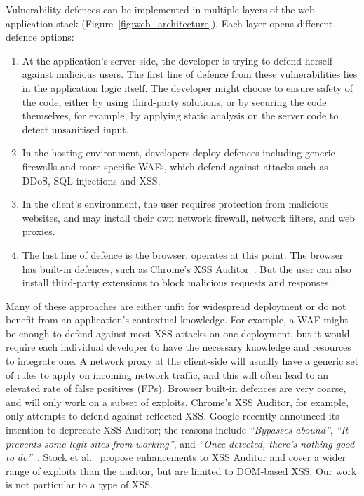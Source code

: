 Vulnerability defences can be implemented in multiple layers of the web application stack (Figure~\ref{fig:web_architecture}). Each layer opens different defence options:
\begin{enumerate}
	\item At the application's server-side, the developer is
          trying to defend herself against malicious users. The first
          line of defence from these vulnerabilities lies in the
          application logic itself. The developer might choose to
          ensure safety of the code, either by using third-party
          solutions, or by securing the code themselves, for example,
          by applying static analysis on the server code to detect
          unsanitised input.
	\item In the hosting environment, developers deploy
          defences including generic firewalls and more specific \acp{WAF}, which defend against attacks
          such as \ac{DDoS}, \ac{SQL} injections and \ac{XSS}.
	\item In the client's environment, the user requires protection from
          malicious websites, and may install their own network firewall,
          network filters, and web proxies.
	\item The last line of defence is the browser. \sys operates at this point.
          The browser has built-in defences, such as
          Chrome's \ac{XSS} Auditor~\cite{xssauditor}. But the user can also
          install third-party extensions to block malicious requests and
          responses. %
\end{enumerate}

Many of these approaches are either unfit for widespread deployment or
do not benefit from an application's contextual knowledge. For
example, a \ac{WAF} might be enough to defend against most \ac{XSS} attacks on
one deployment, but it would require each individual developer to have
the necessary knowledge and resources to integrate one. A network
proxy at the client-side will usually have a generic set of rules to
apply on incoming network traffic, and this will often lead to an
elevated rate of false positives (FPs). Browser built-in defences are very
coarse, and will only work on a subset of exploits. Chrome's XSS
Auditor, for example, only attempts to defend against reflected
\ac{XSS}. Google recently announced its intention to deprecate
XSS Auditor; the reasons include \emph{``Bypasses abound''}, \emph{``It prevents
some legit sites from working''}, and \emph{``Once detected, there's nothing
good to do''}~\cite{deprecatexssauditor}. Stock et
al.~\cite{precise_dom_xss} propose enhancements to 
XSS Auditor and cover a wider range of exploits than the
auditor, but are limited to DOM-based \ac{XSS}. Our work is not particular
to a type of \ac{XSS}.

